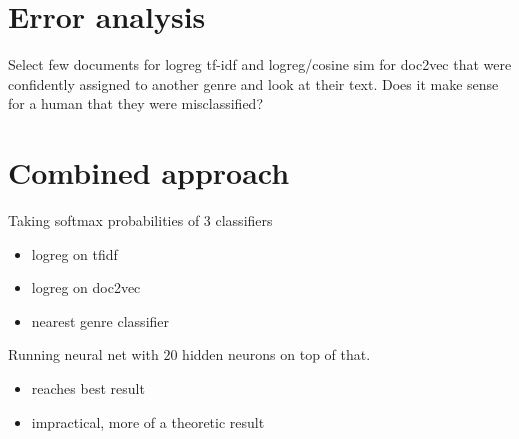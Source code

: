 \section{Error analysis}
Select few documents for logreg tf-idf and logreg/cosine sim for doc2vec that were confidently assigned to another genre and look at their text. Does it make sense for a human that they were misclassified?

\section{Combined approach}
Taking softmax probabilities of 3 classifiers
\begin{itemize}
	\item logreg on tfidf
	\item logreg on doc2vec
	\item nearest genre classifier
\end{itemize}
Running neural net with $20$ hidden neurons on top of that.
\begin{itemize}
	\item reaches best result
	\item impractical, more of a theoretic result
\end{itemize}
















